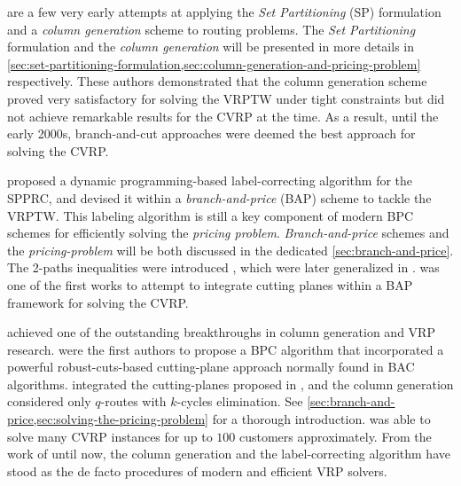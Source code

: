 \Textcite{desrosiers1984, agarwal1989setpartitioningbased}
are a few very early attempts at applying the \textit{Set Partitioning} (SP) formulation
and a \textit{column generation} scheme to routing problems.
The \textit{Set Partitioning} formulation and the \textit{column generation}
will be  presented in more details in \cref{sec:set-partitioning-formulation,sec:column-generation-and-pricing-problem}
respectively.
These authors demonstrated that the column generation scheme proved very satisfactory
for solving the VRPTW under tight constraints
but did not achieve remarkable results for the CVRP at the time.
As a result, until the early 2000s,
branch-and-cut approaches were deemed the best approach for solving the CVRP.

\Textcite{desrochers1992}
proposed a dynamic programming-based label-correcting algorithm for the SPPRC,
and devised it within a \textit{branch-and-price} (BAP) scheme to tackle the VRPTW.
This labeling algorithm is still a key component of modern BPC schemes
for efficiently solving the \textit{pricing problem}.
\textit{Branch-and-price} schemes and the \textit{pricing-problem}
will be both discussed in the dedicated \cref{sec:branch-and-price}.
The 2-paths inequalities were introduced \textcite{kohl1999},
which were later generalized in \textcite{desaulniers2008}.
\Textcite{kohl1999} was one of the first works to attempt
to integrate cutting planes within a BAP framework for solving the CVRP.

\Textcite{fukasawa2006} achieved one of the outstanding breakthroughs in column generation and VRP research.
 were the first authors to propose a BPC algorithm
that incorporated a powerful robust-cuts-based cutting-plane approach normally found in BAC algorithms.
\citeauthor{fukasawa2006} integrated the cutting-planes proposed in \cite{lysgaard2004},
and the column generation considered only $q$-routes with $k$-cycles elimination.
See \cref{sec:branch-and-price,sec:solving-the-pricing-problem} for a thorough introduction.
\textcite{fukasawa2006} was able to solve many CVRP instances for up to $100$ customers approximately.
From the work of \citeauthor{fukasawa2006} until now,
the column generation and the label-correcting algorithm
have stood as the de facto procedures of modern and efficient VRP solvers.

